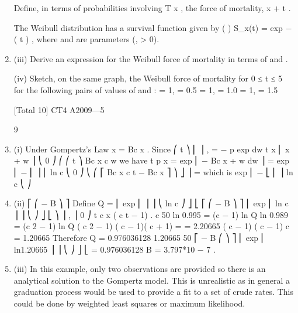 \documentclass[a4paper,12pt]{article}
\begin{document}
\begin{enumerate}
Define, in terms of probabilities involving T x , the force of mortality, \mu x + t .

The Weibull distribution has a survival function given by
(
)
S_x(t) = exp − ( \lambda t ) \beta ,
where \lambda and \beta are parameters (\lambda, \beta > 0).
\item (iii)
Derive an expression for the Weibull force of mortality in terms of \lambda and \beta.

(iv)
Sketch, on the same graph, the Weibull force of mortality for 0 ≤ t ≤ 5 for the
following pairs of values of \lambda and \beta:
\lambda = 1, \beta = 0.5
\lambda = 1, \beta = 1.0
\lambda = 1, \beta = 1.5

[Total 10]
CT4 A2009—5



9
\item (i)
Under Gompertz’s Law
\mu x = Bc x .
Since
⎛ t
⎞
⎜
⎟ ,
=
−
\mu
p
exp
dw
t x
⎜ \int x + w ⎟
⎝ 0
⎠
⎛
⎛ t
⎞
Bc x c w
we have t p x = exp ⎜ − \int Bc x + w dw ⎟ = exp ⎜ −
⎜
⎟
⎜
ln c
⎝ 0
⎠
⎝
⎛ ⎡ Bc x c t − Bc x ⎤ ⎞
⎦ ⎟ =
which is exp ⎜ − ⎣
⎜
⎟
ln c
⎝
⎠
\item (ii)
⎡
⎛ − B ⎞ ⎤
Define Q = ⎢ exp ⎜
⎟ ⎥
⎝ ln c ⎠ ⎦
⎣
⎡
⎛ − B ⎞ ⎤
⎢ exp ⎜ ln c ⎟ ⎥
⎝
⎠ ⎦
⎣
⎞
⎟ ,
⎟
0 ⎠
t
c x ( c t − 1)
.
c 50
ln 0.995 = (c − 1) ln Q
ln 0.989 = (c 2 − 1) ln Q
( c 2 − 1) ( c − 1)( c + 1)
=
= 2.20665
( c − 1)
( c − 1)
c = 1.20665
Therefore Q = 0.976036128
1.20665 50
⎡
− B
⎛
⎞ ⎤
⎢ exp ⎜ ln1.20665 ⎟ ⎥
⎝
⎠ ⎦
⎣
= 0.976036128
B = 3.797*10 − 7 .
\item (iii)
In this example, only two observations are provided so there is an analytical solution to the Gompertz model.
This is unrealistic as in general a graduation process would be used to provide a fit to a set of crude rates.
This could be done by weighted least squares or maximum likelihood.


\end{enumerate}
\end{document}
